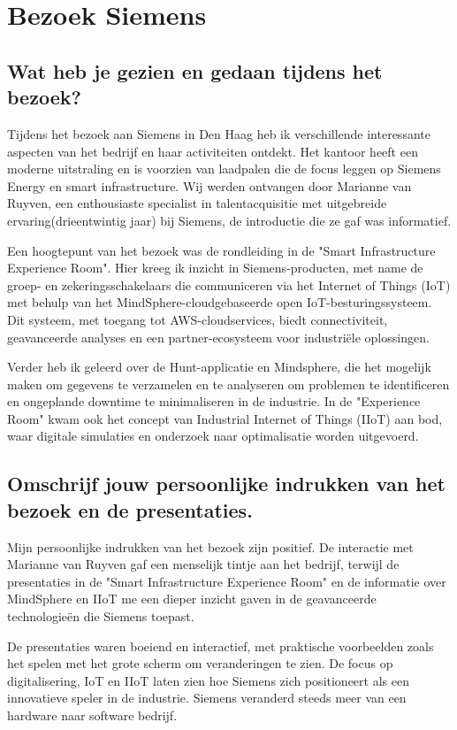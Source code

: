 \section{Bezoek Siemens}
\subsection{Wat heb je gezien en gedaan tijdens het bezoek?}

Tijdens het bezoek aan Siemens in Den Haag heb ik verschillende interessante aspecten van het bedrijf en haar activiteiten ontdekt. Het kantoor heeft een moderne uitstraling en is voorzien van laadpalen die de focus leggen op Siemens Energy en smart infrastructure. Wij werden ontvangen door Marianne van Ruyven, een enthousiaste specialist in talentacquisitie met uitgebreide ervaring(drieentwintig jaar) bij Siemens, de introductie die ze gaf was informatief.

Een hoogtepunt van het bezoek was de rondleiding in de "Smart Infrastructure Experience Room". Hier kreeg ik inzicht in Siemens-producten, met name de groep- en zekeringsschakelaars die communiceren via het Internet of Things (IoT) met behulp van het MindSphere-cloudgebaseerde open IoT-besturingssysteem. Dit systeem, met toegang tot AWS-cloudservices, biedt connectiviteit, geavanceerde analyses en een partner-ecosysteem voor industriële oplossingen.

Verder heb ik geleerd over de Hunt-applicatie en Mindsphere, die het mogelijk maken om gegevens te verzamelen en te analyseren om problemen te identificeren en ongeplande downtime te minimaliseren in de industrie. In de "Experience Room" kwam ook het concept van Industrial Internet of Things (IIoT) aan bod, waar digitale simulaties en onderzoek naar optimalisatie worden uitgevoerd.

\subsection{Omschrijf jouw persoonlijke indrukken van het bezoek en de presentaties.}

Mijn persoonlijke indrukken van het bezoek zijn positief. De interactie met Marianne van Ruyven gaf een menselijk tintje aan het bedrijf, terwijl de presentaties in de "Smart Infrastructure Experience Room" en de informatie over MindSphere en IIoT me een dieper inzicht gaven in de geavanceerde technologieën die Siemens toepast.

De presentaties waren boeiend en interactief, met praktische voorbeelden zoals het spelen met het grote scherm om veranderingen te zien. De focus op digitalisering, IoT en IIoT laten zien hoe Siemens zich positioneert als een innovatieve speler in de industrie. Siemens veranderd steeds meer van een hardware naar software bedrijf.

